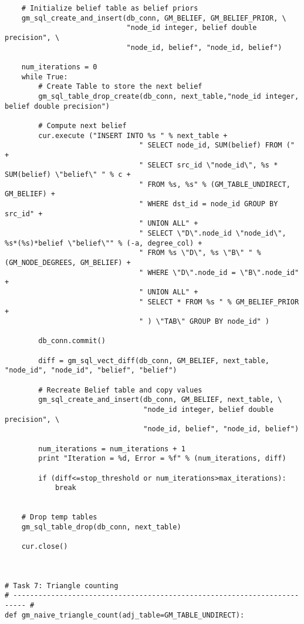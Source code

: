 \begin{lstlisting}
    # Initialize belief table as belief priors
    gm_sql_create_and_insert(db_conn, GM_BELIEF, GM_BELIEF_PRIOR, \
                             "node_id integer, belief double precision", \
                             "node_id, belief", "node_id, belief")

    num_iterations = 0
    while True:
        # Create Table to store the next belief
        gm_sql_table_drop_create(db_conn, next_table,"node_id integer, belief double precision")

        # Compute next belief
        cur.execute ("INSERT INTO %s " % next_table +
                                " SELECT node_id, SUM(belief) FROM (" +
                                " SELECT src_id \"node_id\", %s * SUM(belief) \"belief\" " % c +
                                " FROM %s, %s" % (GM_TABLE_UNDIRECT, GM_BELIEF) +
                                " WHERE dst_id = node_id GROUP BY src_id" +
                                " UNION ALL" +
                                " SELECT \"D\".node_id \"node_id\", %s*(%s)*belief \"belief\"" % (-a, degree_col) +
                                " FROM %s \"D\", %s \"B\" " % (GM_NODE_DEGREES, GM_BELIEF) +
                                " WHERE \"D\".node_id = \"B\".node_id" +
                                " UNION ALL" +
                                " SELECT * FROM %s " % GM_BELIEF_PRIOR +
                                " ) \"TAB\" GROUP BY node_id" )

        db_conn.commit()

        diff = gm_sql_vect_diff(db_conn, GM_BELIEF, next_table, "node_id", "node_id", "belief", "belief")

        # Recreate Belief table and copy values
        gm_sql_create_and_insert(db_conn, GM_BELIEF, next_table, \
                                 "node_id integer, belief double precision", \
                                 "node_id, belief", "node_id, belief")

        num_iterations = num_iterations + 1
        print "Iteration = %d, Error = %f" % (num_iterations, diff)

        if (diff<=stop_threshold or num_iterations>max_iterations):
            break


    # Drop temp tables
    gm_sql_table_drop(db_conn, next_table)

    cur.close()



# Task 7: Triangle counting
# ------------------------------------------------------------------------- #
def gm_naive_triangle_count(adj_table=GM_TABLE_UNDIRECT):


\end{lstlisting}
